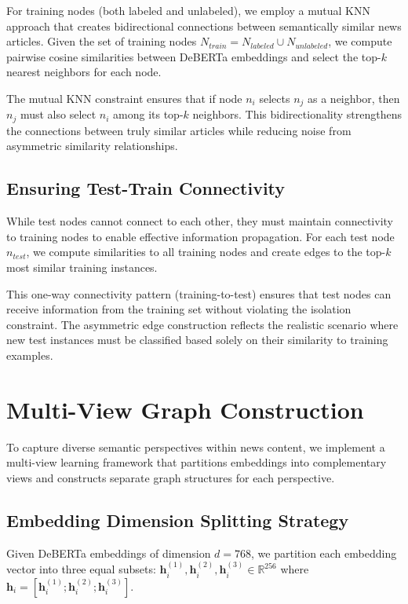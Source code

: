 For training nodes (both labeled and unlabeled), we employ a mutual KNN approach that creates bidirectional connections between semantically similar news articles. Given the set of training nodes $N_{train} = N_{labeled} \cup N_{unlabeled}$, we compute pairwise cosine similarities between DeBERTa embeddings and select the top-$k$ nearest neighbors for each node.

The mutual KNN constraint ensures that if node $n_i$ selects $n_j$ as a neighbor, then $n_j$ must also select $n_i$ among its top-$k$ neighbors. This bidirectionality strengthens the connections between truly similar articles while reducing noise from asymmetric similarity relationships.

\subsection{Ensuring Test-Train Connectivity}

While test nodes cannot connect to each other, they must maintain connectivity to training nodes to enable effective information propagation. For each test node $n_{test}$, we compute similarities to all training nodes and create edges to the top-$k$ most similar training instances.

This one-way connectivity pattern (training-to-test) ensures that test nodes can receive information from the training set without violating the isolation constraint. The asymmetric edge construction reflects the realistic scenario where new test instances must be classified based solely on their similarity to training examples.

\section{Multi-View Graph Construction}

To capture diverse semantic perspectives within news content, we implement a multi-view learning framework that partitions embeddings into complementary views and constructs separate graph structures for each perspective.

\subsection{Embedding Dimension Splitting Strategy}

Given DeBERTa embeddings of dimension $d = 768$, we partition each embedding vector into three equal subsets: $\mathbf{h}_i^{(1)}, \mathbf{h}_i^{(2)}, \mathbf{h}_i^{(3)} \in \mathbb{R}^{256}$ where $\mathbf{h}_i = [\mathbf{h}_i^{(1)}; \mathbf{h}_i^{(2)}; \mathbf{h}_i^{(3)}]$.

